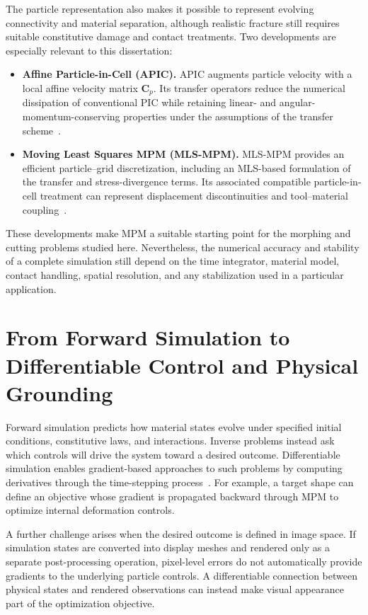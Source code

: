     The particle representation also makes it possible to represent evolving connectivity and material separation, although realistic fracture still requires suitable constitutive damage and contact treatments. Two developments are especially relevant to this dissertation:
    \begin{itemize}
        \item \textbf{Affine Particle-in-Cell (APIC).} APIC augments particle velocity with a local affine velocity matrix $\mathbf{C}_p$. Its transfer operators reduce the numerical dissipation of conventional PIC while retaining linear- and angular-momentum-conserving properties under the assumptions of the transfer scheme~\citep{2015-APIC,jiang2017angular}.
        \item \textbf{Moving Least Squares MPM (MLS-MPM).} MLS-MPM provides an efficient particle--grid discretization, including an MLS-based formulation of the transfer and stress-divergence terms. Its associated compatible particle-in-cell treatment can represent displacement discontinuities and tool--material coupling~\citep{2018-MLSMPM}.
    \end{itemize}
    
    These developments make MPM a suitable starting point for the morphing and cutting problems studied here. Nevertheless, the numerical accuracy and stability of a complete simulation still depend on the time integrator, material model, contact handling, spatial resolution, and any stabilization used in a particular application.

\section{From Forward Simulation to Differentiable Control and Physical Grounding}
    Forward simulation predicts how material states evolve under specified initial conditions, constitutive laws, and interactions. Inverse problems instead ask which controls will drive the system toward a desired outcome. Differentiable simulation enables gradient-based approaches to such problems by computing derivatives through the time-stepping process~\citep{2018-ChainQueen,coros2021differentiable,10.1145/3527660}. For example, a target shape can define an objective whose gradient is propagated backward through MPM to optimize internal deformation controls.
    
    A further challenge arises when the desired outcome is defined in image space. If simulation states are converted into display meshes and rendered only as a separate post-processing operation, pixel-level errors do not automatically provide gradients to the underlying particle controls. A differentiable connection between physical states and rendered observations can instead make visual appearance part of the optimization objective.
    
